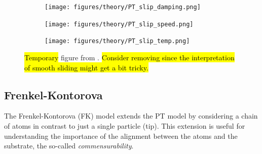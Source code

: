 \begin{figure}[H]
  \centering
  \begin{subfigure}[t]{0.32\textwidth}
      \centering
      \texttt{[image: figures/theory/PT\_slip\_damping.png]}
      \caption{}
  \end{subfigure}
  \hfill
  \begin{subfigure}[t]{0.32\textwidth}
      \centering
      \texttt{[image: figures/theory/PT\_slip\_speed.png]}
      \label{fig:PT_slip_vel}
      \caption{}
  \end{subfigure}
  \hfill
  \begin{subfigure}[t]{0.32\textwidth}
      \centering
      \texttt{[image: figures/theory/PT\_slip\_temp.png]}
      \caption{}
  \end{subfigure}
  \hfill
     \caption{\hl{Temporary} figure from \cite{Yalin_2011}. \hl{Consider removing since the interpretation of smooth sliding might get a bit tricky.}}
     \label{fig:PT_slip_var}
\end{figure}










\subsection{Frenkel-Kontorova}

The Frenkel-Kontorova (\acrshort{FK}) model \cite{Frenkel_1938} extends the \acrshort{PT} model by considering a chain of atoms in contrast to just a single particle (tip). This extension is useful for understanding the importance of the alignment between the atoms and the substrate, the so-called \textit{commensurability}.

